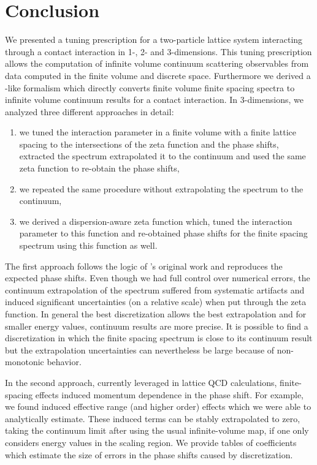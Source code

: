 \section{Conclusion}\label{sec:conclusion}

We presented a tuning prescription for a two-particle lattice system interacting through a contact interaction in 1-, 2- and 3-dimensions.
This tuning prescription allows the computation of infinite volume continuum scattering observables from data computed in the finite volume and discrete space.
Furthermore we derived a \Luscher-like formalism which directly converts finite volume finite spacing spectra to infinite volume continuum results for a contact interaction.
In 3-dimensions, we analyzed three different approaches in detail:
\begin{enumerate}
	\item we tuned the interaction parameter in a finite volume with a finite lattice spacing to the intersections of the \Luscher zeta function and the phase shifts, extracted the spectrum extrapolated it to the continuum and used the same \Luscher zeta function to re-obtain the phase shifts,
	\item we repeated the same procedure without extrapolating the spectrum to the continuum,
	\item we derived a dispersion-aware zeta function which, tuned the interaction parameter to this function and re-obtained phase shifts for the finite spacing spectrum using this function as well.
\end{enumerate}

The first approach follows the logic of \Luscher's original work and reproduces the expected phase shifts.
Even though we had full control over numerical errors, the continuum extrapolation of the spectrum suffered from systematic artifacts and induced significant uncertainties (on a relative scale) when put through the zeta function.
In general the best discretization allows the best extrapolation and for smaller energy values, continuum results are more precise.
It is possible to find a discretization in which the finite spacing spectrum is close to its continuum result but the extrapolation uncertainties can nevertheless be large because of non-monotonic behavior.

In the second approach, currently leveraged in lattice QCD calculations, finite-spacing effects induced momentum dependence in the phase shift.
For example, we found induced effective range (and higher order) effects which we were able to analytically estimate.
These induced terms can be stably extrapolated to zero, taking the continuum limit after using the usual infinite-volume map, if one only considers energy values in the scaling region.
We provide tables of coefficients which estimate the size of errors in the phase shifts caused by discretization.

